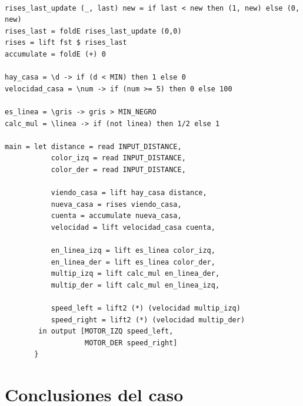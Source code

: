 \begin{verbatim}

rises_last_update (_, last) new = if last < new then (1, new) else (0, new)
rises_last = foldE rises_last_update (0,0)
rises = lift fst $ rises_last
accumulate = foldE (+) 0

hay_casa = \d -> if (d < MIN) then 1 else 0
velocidad_casa = \num -> if (num >= 5) then 0 else 100

es_linea = \gris -> gris > MIN_NEGRO
calc_mul = \linea -> if (not linea) then 1/2 else 1

main = let distance = read INPUT_DISTANCE,
           color_izq = read INPUT_DISTANCE,
           color_der = read INPUT_DISTANCE,

           viendo_casa = lift hay_casa distance,
           nueva_casa = rises viendo_casa,
           cuenta = accumulate nueva_casa,
           velocidad = lift velocidad_casa cuenta,

           en_linea_izq = lift es_linea color_izq,
           en_linea_der = lift es_linea color_der,
           multip_izq = lift calc_mul en_linea_der,
           multip_der = lift calc_mul en_linea_izq,

           speed_left = lift2 (*) (velocidad multip_izq)
           speed_right = lift2 (*) (velocidad multip_der)
        in output [MOTOR_IZQ speed_left,
                   MOTOR_DER speed_right]
       }

\end{verbatim}

\section {Conclusiones del caso}


